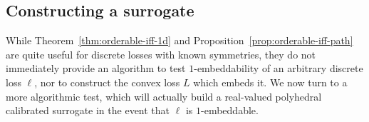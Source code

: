\documentclass[anon]{colt2020} %
\newcommand{\reals}{\mathbb{R}}
\newcommand{\nonnegreals}{\reals_{\geq 0}}%
\newcommand{\R}{\mathcal{R}}
\newcommand{\Y}{\mathcal{Y}}
\begin{document}
\subsection{Constructing a surrogate}
While Theorem~\ref{thm:orderable-iff-1d} and Proposition~\ref{prop:orderable-iff-path} are quite useful for discrete losses with known symmetries, they do not immediately provide an algorithm to test $1$-embeddability of an arbitrary discrete loss $\ell$, nor to construct the convex loss $L$ which embeds it.
We now turn to a more algorithmic test, which will actually build a real-valued polyhedral calibrated surrogate in the event that $\ell$ is $1$-embeddable.

\end{document}
